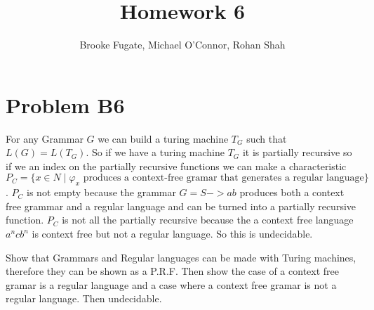 \documentclass[12pt]{article}
\begin{document}
\pagestyle{plain}
\titleformat{\subsection}[runin]
  {\normalfont\large\bfseries}{\thesubsection}{1em}{}
\titleformat{\subsubsection}[runin]
  {\bfseries}{}{1em}{}

\title{Homework 6}
\author{Brooke Fugate, Michael O'Connor, Rohan Shah}
\date{}

\maketitle

\section*{Problem B6}

For any Grammar $G$ we can build a turing machine $T_G$ such that $L(G) = L(T_G)$.  So if we have a turing machine $T_G$ it is partially recursive so if we an index on the partially recursive functions we can make a characteristic $P_C = \{ x \in N \mid \varphi_x \text{ produces a context-free gramar that generates a regular language} \}$.  $P_C$ is not empty because the grammar $G = S -> ab$ produces both a context free grammar and a regular language and can be turned into a partially recursive function.  $P_C$ is not all the partially recursive because the a context free language $a^ncb^n$ is context free but not a regular language.  So this is undecidable.

Show that Grammars and Regular languages can be made with Turing machines, therefore they can be shown as a P.R.F.  Then show the case of a context free gramar is a regular language and a case where a context free gramar is not a regular language.  Then undecidable.
\end{document}
